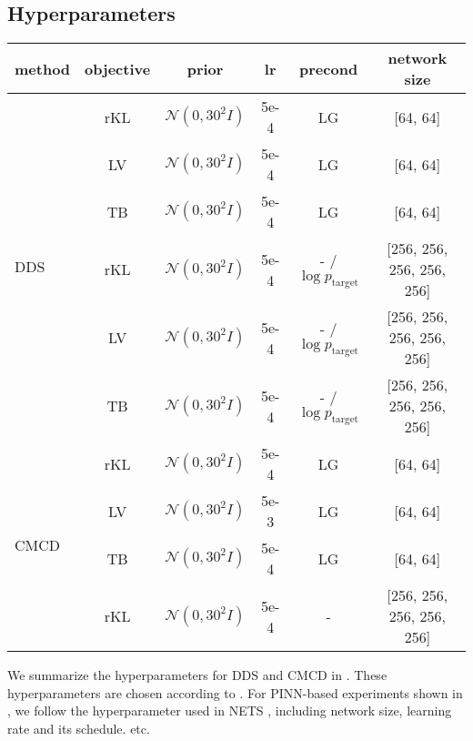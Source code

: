 \documentclass{article} %
\begin{document}
\subsection{Hyperparameters}

\begin{table}[H]
\centering
   \label{tab:hyperparam}
    \begin{tabular}{@{}lccccc@{}}
    \toprule
    method & objective & prior & lr & precond & network size \\ \midrule
    \multirow{6}{*}{DDS} & rKL & $\mathcal{N}(0, 30^2I)$ &  5e-4 & LG & [64, 64] \\
    & LV & $\mathcal{N}(0, 30^2I)$ &  5e-4  & LG & [64, 64] \\
    & TB & $\mathcal{N}(0, 30^2I)$ &   5e-4 & LG & [64, 64]\\
   & rKL & $\mathcal{N}(0, 30^2I)$ &  5e-4 & - / $\log p_\text{target}$& [256, 256, 256, 256, 256] \\
    & LV & $\mathcal{N}(0, 30^2I)$ &  5e-4  & - / $\log p_\text{target}$& [256, 256, 256, 256, 256] \\
    & TB & $\mathcal{N}(0, 30^2I)$ &   5e-4 & - / $\log p_\text{target}$  & [256, 256, 256, 256, 256]\\\midrule
    \multirow{4}{*}{CMCD} & rKL & $\mathcal{N}(0, 30^2I)$ & 5e-4 & LG & [64, 64] \\
    & LV & $\mathcal{N}(0, 30^2I)$ & 5e-3 & LG & [64, 64]\\ 
    & TB & $\mathcal{N}(0, 30^2I)$ & 5e-4 & LG & [64, 64] \\ 
    & rKL & $\mathcal{N}(0, 30^2I)$ & 5e-4 & - & [256, 256, 256, 256, 256]  \\
    \bottomrule
    \end{tabular}
\end{table}

We summarize the hyperparameters for DDS and CMCD in .
These hyperparameters are chosen according to \citet{blessingbeyond}.
For PINN-based experiments shown in , we follow the hyperparameter used in NETS \citep{albergo2024nets}, including network size, learning rate and its schedule. etc.
\end{document}
